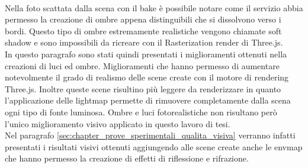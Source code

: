 \\
Nella foto scattata dalla scena con il bake è possibile notare come il servizio abbia permesso la creazione di ombre appena distinguibili che si dissolvono verso i bordi. 
Questo tipo di ombre estremamente realistiche vengono chiamate soft shadow e sono impossibili da ricreare con il Rasterization render di Three.js. 
\\
In questo paragrafo sono stati quindi presentati i miglioramenti ottenuti nella creazioni di luci ed ombre. Miglioramenti che hanno permesso di aumentare notevolmente il grado di realismo delle scene create con il motore di rendering Three.js.
Inoltre queste scene risultino più leggere da renderizzare in quanto l’applicazione delle lightmap permette di rimuovere completamente dalla scena ogni tipo di fonte luminosa.
Ombre e luci fotorealistiche non risultano però l’unico miglioramento visivo applicato in questo lavoro di tesi.
\\
Nel paragrafo \ref{sec:chapter_prove_sperimentali_qualita_visiva} verranno infatti presentati i risultati visivi ottenuti aggiungendo alle scene create anche le envmap che hanno permesso la creazione di effetti di riflessione e rifrazione.

